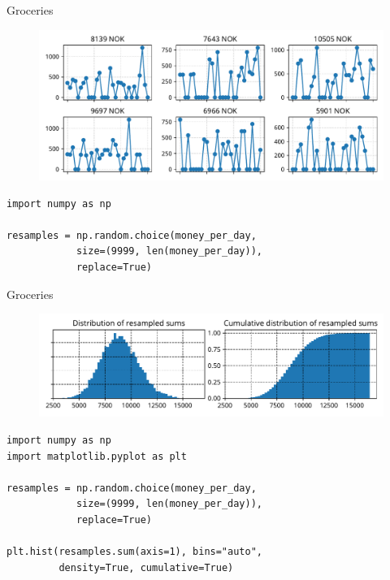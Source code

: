 \documentclass[12pt, aspectratio=149]{beamer}
\theoremstyle{plain}
\begin{document}
\begin{frame}[fragile]{Groceries}
\begin{center}
 \begin{figure}
    	\centering
    	\includegraphics[width=0.99\linewidth]{figures/groceries_data_resamples}
 \end{figure}
 \end{center}

\begin{center}
\begin{verbatim} 
import numpy as np

resamples = np.random.choice(money_per_day, 
            size=(9999, len(money_per_day)), 
            replace=True)
\end{verbatim}
\end{center}
     
\end{frame}

\begin{frame}[fragile]{Groceries}
\begin{center}
 \begin{figure}
    	\centering
    	\includegraphics[width=0.99\linewidth]{figures/groceries_data_resampled}
 \end{figure}
 \end{center}

\begin{center}
\begin{verbatim} 
import numpy as np
import matplotlib.pyplot as plt

resamples = np.random.choice(money_per_day, 
            size=(9999, len(money_per_day)), 
            replace=True)

plt.hist(resamples.sum(axis=1), bins="auto", 
         density=True, cumulative=True)
\end{verbatim}
\end{center}
\end{frame}
\end{document}
